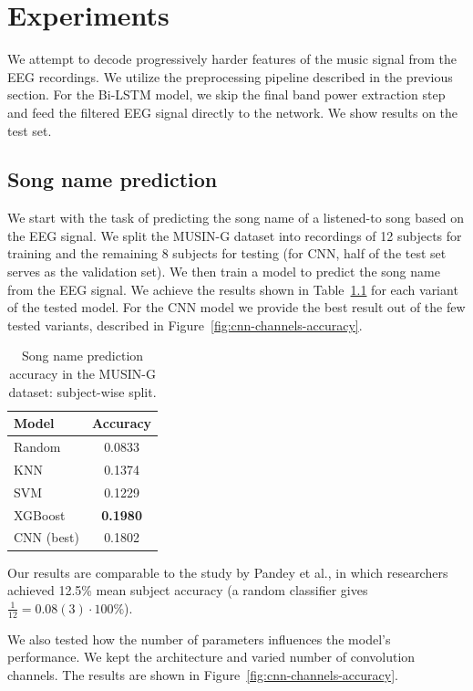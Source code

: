 
\chapter{Experiments}
\label{chap:experiments}

We attempt to decode progressively harder features of the music signal from the EEG recordings.
We utilize the preprocessing pipeline described in the previous section.
For the Bi-LSTM model, we skip the final band power extraction step and feed the filtered EEG signal directly to the network.
We show results on the test set.

\section{Song name prediction}

We start with the task of predicting the song name of a listened-to song based on the EEG signal.
We split the MUSIN-G dataset into recordings of 12 subjects for training and the remaining 8 subjects for testing (for CNN, half of the test set serves as the validation set).
We then train a model to predict the song name from the EEG signal.
We achieve the results shown in Table~\ref{tab:song-prediction} for each variant of the tested model.
For the CNN model we provide the best result out of the few tested variants, described in Figure~\ref{fig:cnn-channels-accuracy}.

\begin{table}[h]
  \centering
  \begin{tabular}{|l|c|}
    \hline
    \textbf{Model} & \textbf{Accuracy} \\
    \hline
    Random  &  0.0833  \\
    KNN     & 0.1374 \\
    SVM     & 0.1229 \\
    XGBoost & \textbf{0.1980} \\
    CNN (best)      & 0.1802 \\
    \hline
  \end{tabular}
  \caption{Song name prediction accuracy in the MUSIN-G dataset: subject-wise split.}
  \label{tab:song-prediction}
\end{table}


Our results are comparable to the study by Pandey et al.\cite{pandey}, in which researchers achieved 12.5\% mean subject accuracy (a random classifier gives \(  \frac{1}{12} = 0.08(3) \cdot 100\% \)).

We also tested how the number of parameters influences the model's performance. We kept the architecture and varied number of convolution channels. The results are shown in Figure~\ref{fig:cnn-channels-accuracy}.

